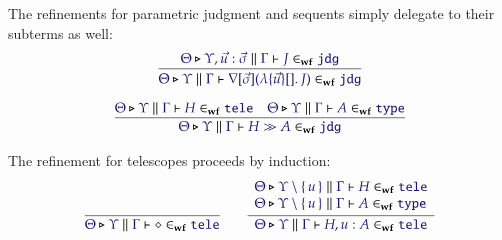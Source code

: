 \documentclass[11pt]{article}
\theoremstyle{definition}
\theoremstyle{remark}
\numberwithin{equation}{section}
\def\IModeColorName{MidnightBlue}
\newcommand\IMode[1]{{\color{\IModeColorName}{#1}}}
\newcommand\MkSet[1]{\left\{\,#1\,\right\}}
\newcommand\MkBTm[3]{\mathbb{\lambda}\{#1\}[#2].\, #3}
\newcommand\IsWf[5]{%
  \IMode{#1}\triangleright%
  \IMode{#2}\parallel%
  \IMode{#3}\vdash%
  \IMode{#4}\in_{\mathbf{wf}}\IMode{#5}%
}
\newcommand\App[2]{#1(#2)}
\begin{document}
The refinements for parametric judgment and sequents simply delegate to their
subterms as well:
\begin{gather*}
  \infer{
    \IsWf{\Theta}{\Upsilon}{\Gamma}{
      \App{\OpNabla{\vec{\sigma}}}{
        \MkBTm{\vec{u}}{}{J}
      }
    }{\SortJdg}
  }{
    \IsWf{\Theta}{\Upsilon,\vec{u}:\vec{\sigma}}{\Gamma}{J}{\SortJdg}
  }
\\[6pt]
  \infer{
    \IsWf{\Theta}{\Upsilon}{\Gamma}{
      H\gg A
    }{\SortJdg}
  }{
    \IsWf{\Theta}{\Upsilon}{\Gamma}{H}{\SortTele}
&
    \IsWf{\Theta}{\Upsilon}{\Gamma}{A}{\SortType}
  }
\end{gather*}

The refinement for telescopes proceeds by induction:
\begin{gather*}
  \infer{
    \IsWf{\Theta}{\Upsilon}{\Gamma}{\diamond}{\SortTele}
  }{
  }
\qquad
  \infer{
    \IsWf{\Theta}{\Upsilon}{\Gamma}{H,u:A}{\SortTele}
  }{
    \begin{array}{l}
      \IsWf{\Theta}{\Upsilon\setminus\MkSet{u}}{\Gamma}{H}{\SortTele}
\\
      \IsWf{\Theta}{\Upsilon\setminus\MkSet{u}}{\Gamma}{A}{\SortType}
    \end{array}
  }
\end{gather*}

\ifdraft{}{
  \nocite{*}
  
  
}
\end{document}
